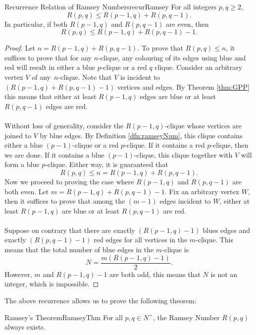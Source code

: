 \documentclass[math]{amznotes}
\theoremstyle{remark}
\begin{document}
\begin{thmbox}{Recurrence Relation of Ramsey Numbers}{recurRamsey}
    For all integers $p, q \geq 2$,
    \begin{equation*}
        R(p, q) \leq R(p - 1, q) + R(p, q - 1).
    \end{equation*}
    In particular, if both $R(p - 1, q)$ and $R(p, q - 1)$ are even, then
    \begin{equation*}
        R(p, q) \leq R(p - 1, q) + R(p, q - 1) - 1.
    \end{equation*}
    \tcblower
    \begin{proof}
        Let $n = R(p - 1, q) + R(p, q - 1)$. To prove that $R(p, q) \leq n$, it suffices to prove that for any $n$-clique, any colouring of its edges using blue and red will result in either a blue $p$-clique or a red $q$ clique. Consider an arbitrary vertex $V$ of any~$n$-clique. Note that $V$ is incident to $\left(R(p - 1, q) + R(p, q - 1) - 1\right)$ vertices and edges. By Theorem \ref{thm:GPP} this means that either at least $R(p - 1, q)$ edges are blue or at least $R(p, q - 1)$ edges are red.
        \\\\ 
        Without loss of generality, consider the $R(p - 1, q)$-clique whose vertices are joined to $V$ by blue edges. By Definition \ref{dfn:ramseyNum}, this clique contains either a blue $(p - 1)$-clique or a red $p$-clique. If it contains a red $p$-clique, then we are done. If it contains a blue $(p - 1)$-clique, this clique together with $V$ will form a blue $p$-clique. Either way, it is guaranteed that
        \begin{equation*}
            R(p, q) \leq n = R(p - 1, q) + R(p, q - 1).
        \end{equation*}
        Now we proceed to proving the case where $R(p - 1, q)$ and $R(p, q - 1)$ are both even. Let $m = R(p - 1, q) + R(p, q - 1) - 1$. Fix an arbitrary vertex $W$, then it suffices to prove that among the $(m - 1)$ edges incident to $W$, either at least $R(p - 1, q)$ are blue or at least $R(p, q - 1)$ are red.
        \\\\
        Suppose on contrary that there are exactly $\left(R(p - 1, q) - 1\right)$ blues edges and exactly $\left(R(p, q - 1) - 1\right)$ red edges for all vertices in the $m$-clique. This means that the total number of blue edges in the $m$-clique is
        \begin{equation*}
            N = \frac{m\left(R(p - 1, q) - 1\right)}{2}.
        \end{equation*}
        However, $m$ and $R(p - 1, q) - 1$ are both odd, this means that $N$ is not an integer, which is impossible.
    \end{proof}
\end{thmbox}
The above recurrence allows us to prove the following theorem:
\begin{thmbox}{Ramsey's Theorem}{RamseyThm}
    For all $p, q \in N^+$, the Ramsey Number $R(p, q)$ always exists.
\end{thmbox}
\end{document}
